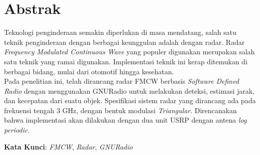 
\chapter*{Abstrak}
\vspace*{0.7cm}

Teknologi penginderaan semakin diperlukan di masa mendatang, salah satu teknik penginderaan dengan berbagai keunggulan adalah dengan radar. Radar \textit{Frequency Modulated Continuous Wave} yang populer digunakan merupakan salah satu teknik yang ramai digunakan. Implementasi teknik ini kerap ditemukan di berbagai bidang, mulai dari otomotif hingga kesehatan.\\

Pada penelitian ini, telah dirancang radar FMCW berbasis \textit{Software Defined Radio} dengan menggunakan GNURadio untuk melakukan deteksi, estimasi jarak, dan kecepatan dari suatu objek. Spesifikasi sistem radar yang dirancang ada pada frekuensi tengah 3 GHz, dengan bentuk modulasi \textit{Triangular}. Direncanakan bahwa implementasi akan dilakukan dengan dua unit USRP dengan antena \textit{log periodic}.



\vspace*{0.2cm}

\noindent \textbf{Kata Kunci}: \textit{FMCW}, \textit{Radar}, \textit{GNURadio}\\ 

\newpage